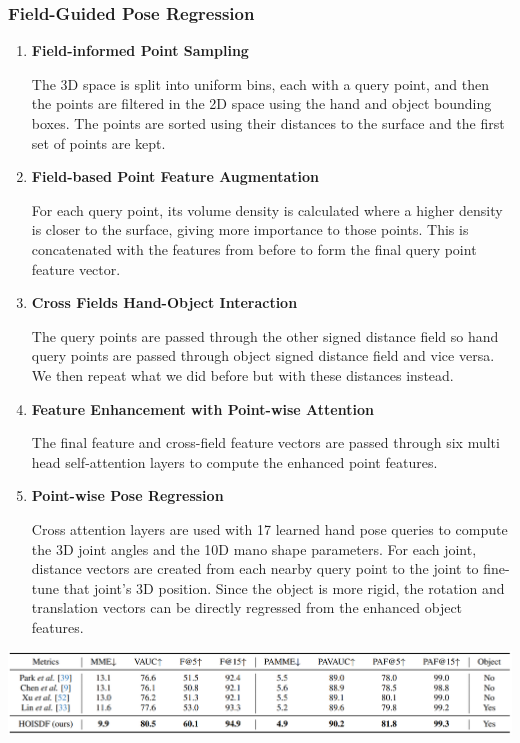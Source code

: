 \documentclass{article}
\begin{document}
\subsubsection*{Field-Guided Pose Regression}
\begin{enumerate}
    \item \textbf{Field-informed Point Sampling}
    
    The 3D space is split into uniform bins, each with a query point, and then the points are filtered in the 2D space using the hand and object bounding boxes. The points are sorted using their distances to the surface and the first set of points are kept.
    
    \item \textbf{Field-based Point Feature Augmentation}
    
    For each query point, its volume density is calculated where a higher density is closer to the surface, giving more importance to those points. This is concatenated with the features from before to form the final query point feature vector.

    \item \textbf{Cross Fields Hand-Object Interaction}
    
    The query points are passed through the other signed distance field so hand query points are passed through object signed distance field and vice versa. We then repeat what we did before but with these distances instead.

    \item \textbf{Feature Enhancement with Point-wise Attention}
    
    The final feature and cross-field feature vectors are passed through six multi head self-attention layers to compute the enhanced point features.

    \item \textbf{Point-wise Pose Regression}
    
    Cross attention layers are used with 17 learned hand pose queries to compute the 3D joint angles and the 10D mano shape parameters. For each joint, distance vectors are created from each nearby query point to the joint to fine-tune that joint’s 3D position. Since the object is more rigid, the rotation and translation vectors can be directly regressed from the enhanced object features.
\end{enumerate}

\begin{center}
    \includegraphics[scale=0.3]{hoisdf-3.png}
\end{center}
\end{document}
